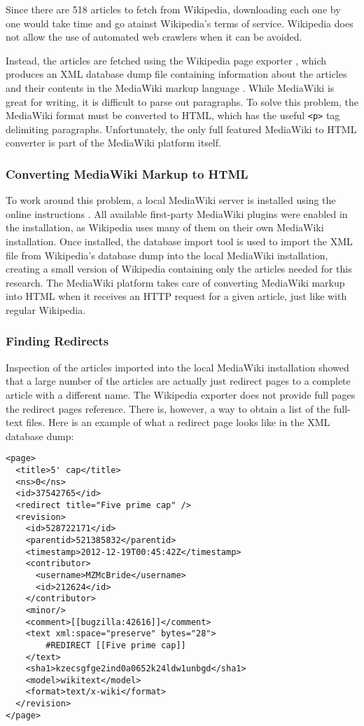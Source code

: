 Since there are 518 articles to fetch from Wikipedia, downloading each one by one would take time and go atainst Wikipedia's terms of service. Wikipedia does not allow the use of automated web crawlers when it can be avoided.

Instead, the articles are fetched using the Wikipedia page exporter \cite{wiki-exporter}, which produces an XML database dump file containing information about the articles and their contents in the MediaWiki markup language \cite{mediawiki-markup}.
While MediaWiki is great for writing, it is difficult to parse out paragraphs.
To solve this problem, the MediaWiki format must be converted to HTML, which has the useful {\tt <p>} tag delimiting paragraphs.
Unfortunately, the only full featured MediaWiki to HTML converter is part of the MediaWiki platform itself.

\subsubsection{Converting MediaWiki Markup to HTML}

To work around this problem, a local MediaWiki server is installed using the online instructions \cite{mediawiki-installation}.
All available first-party MediaWiki plugins were enabled in the installation, as Wikipedia uses many of them on their own MediaWiki installation.
Once installed, the database import tool \cite{mediawiki-import} is used to import the XML file from Wikipedia's database dump into the local MediaWiki installation, creating a small version of Wikipedia containing only the articles needed for this research.
The MediaWiki platform takes care of converting MediaWiki markup into HTML when it receives an HTTP request for a given article, just like with regular Wikipedia.

\subsubsection{Finding Redirects}

Inspection of the articles imported into the local MediaWiki installation showed that a large number of the articles are actually just redirect pages to a complete article with a different name.
The Wikipedia exporter does not provide full pages the redirect pages reference.
There is, however, a way to obtain a list of the full-text files.
Here is an example of what a redirect page looks like in the XML database dump:

\begin{lstlisting}
<page>
  <title>5' cap</title>
  <ns>0</ns>
  <id>37542765</id>
  <redirect title="Five prime cap" />
  <revision>
    <id>528722171</id>
    <parentid>521385832</parentid>
    <timestamp>2012-12-19T00:45:42Z</timestamp>
    <contributor>
      <username>MZMcBride</username>
      <id>212624</id>
    </contributor>
    <minor/>
    <comment>[[bugzilla:42616]]</comment>
    <text xml:space="preserve" bytes="28">
        #REDIRECT [[Five prime cap]]
    </text>
    <sha1>kzecsgfge2ind0a0652k24ldw1unbgd</sha1>
    <model>wikitext</model>
    <format>text/x-wiki</format>
  </revision>
</page>
\end{lstlisting}

